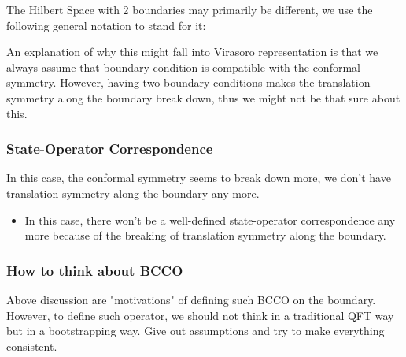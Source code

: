 The Hilbert Space with 2 boundaries may primarily be different, we
use the following general notation to stand for it:

An explanation of why this might fall into Virasoro representation is
that we always assume that boundary condition is compatible with the
conformal symmetry.
However, having two boundary conditions makes the translation
symmetry along the boundary break down, thus we might not be that
sure about this.


\subsubsection{State-Operator Correspondence}

In this case, the conformal symmetry seems to break down more, we
don't have translation symmetry along the boundary any more.
\begin{itemize}
  \item In this case, there won't be a well-defined state-operator
    correspondence any more because of the breaking of translation
    symmetry along the boundary.
\end{itemize}


\subsubsection{How to think about BCCO}

Above discussion are "motivations" of defining such BCCO on the boundary. However, to define such operator, we should not think in a traditional QFT way but in a bootstrapping way. Give out assumptions and try to make everything consistent.

